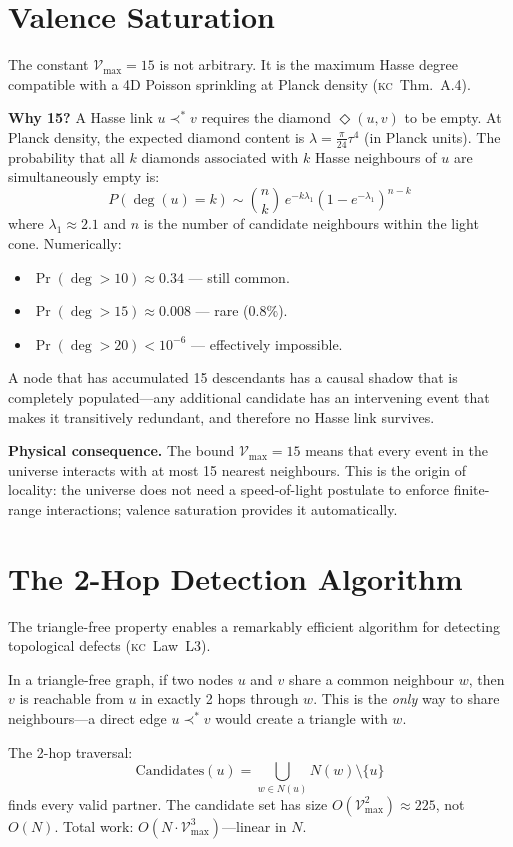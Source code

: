 \documentclass[11pt, a4paper, openany]{book}
\newcommand{\covers}{\prec^*}              %
\newcommand{\KC}[1]{\textnormal{(\textsc{kc}~#1)}}
\newcounter{thm}[chapter]
\begin{document}
\section{Valence Saturation}\label{sec:valence}

The constant $\mathcal{V}_{\max} = 15$ is not arbitrary. It is the maximum Hasse
degree compatible with a 4D Poisson sprinkling at Planck density
\KC{Thm.~A.4}.

\textbf{Why 15?} A Hasse link $u \covers v$ requires the diamond
$\Diamond(u,v)$ to be empty. At Planck density, the expected diamond
content is $\lambda = \frac{\pi}{24}\tau^4$ (in Planck units). The
probability that all $k$ diamonds associated with $k$ Hasse neighbours
of $u$ are simultaneously empty is:
\[
  P(\deg(u) = k) \sim \binom{n}{k}\,e^{-k\lambda_1}(1-e^{-\lambda_1})^{n-k}
\]
where $\lambda_1 \approx 2.1$ and $n$ is the number of candidate
neighbours within the light cone. Numerically:
\begin{itemize}
  \item $\Pr(\deg > 10) \approx 0.34$ --- still common.
  \item $\Pr(\deg > 15) \approx 0.008$ --- rare ($0.8\%$).
  \item $\Pr(\deg > 20) < 10^{-6}$ --- effectively impossible.
\end{itemize}
A node that has accumulated 15 descendants has a causal
shadow that is completely populated---any additional candidate
has an intervening event that makes it transitively redundant,
and therefore no Hasse link survives.

\textbf{Physical consequence.} The bound $\mathcal{V}_{\max} = 15$ means that
every event in the universe interacts with at most 15 nearest
neighbours. This is the origin of locality: the universe does not
need a speed-of-light postulate to enforce finite-range interactions;
valence saturation provides it automatically.

\section{The 2-Hop Detection Algorithm}

The triangle-free property enables a remarkably efficient algorithm for
detecting topological defects \KC{Law~L3}.

\begin{theorem}[2-Hop Detection \KC{Thm.~B.2}]\label{thm:2hop}
In a triangle-free graph, if two nodes $u$ and $v$ share a common
neighbour $w$, then $v$ is reachable from $u$ in exactly 2 hops through
$w$. This is the \emph{only} way to share neighbours---a direct edge
$u \covers v$ would create a triangle with $w$.

The 2-hop traversal:
\[
  \mathrm{Candidates}(u) = \bigcup_{w \in N(u)} N(w) \setminus \{u\}
\]
finds every valid partner. The candidate set has size $O(\mathcal{V}_{\max}^2)
\approx 225$, not $O(N)$. Total work: $O(N \cdot \mathcal{V}_{\max}^3)$---linear
in $N$.
\end{theorem}
\end{document}
